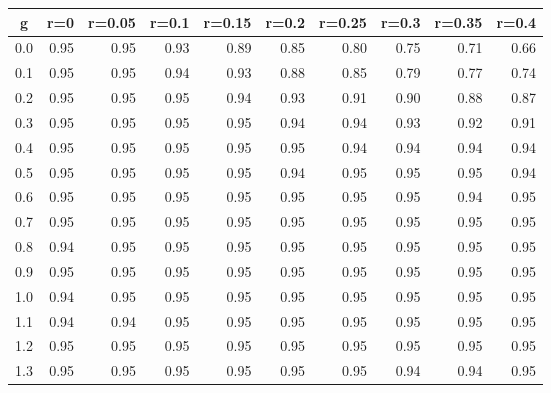%
\begin{table}[!tbp]
 \begin{center}
 \begin{tabular}{rrrrrrrrrr}\hline\hline
\multicolumn{1}{c}{g}&\multicolumn{1}{c}{r=0}&\multicolumn{1}{c}{r=0.05}&\multicolumn{1}{c}{r=0.1}&\multicolumn{1}{c}{r=0.15}&\multicolumn{1}{c}{r=0.2}&\multicolumn{1}{c}{r=0.25}&\multicolumn{1}{c}{r=0.3}&\multicolumn{1}{c}{r=0.35}&\multicolumn{1}{c}{r=0.4}\tabularnewline
\hline
0.0&0.95&0.95&0.93&0.89&0.85&0.80&0.75&0.71&0.66\tabularnewline
0.1&0.95&0.95&0.94&0.93&0.88&0.85&0.79&0.77&0.74\tabularnewline
0.2&0.95&0.95&0.95&0.94&0.93&0.91&0.90&0.88&0.87\tabularnewline
0.3&0.95&0.95&0.95&0.95&0.94&0.94&0.93&0.92&0.91\tabularnewline
0.4&0.95&0.95&0.95&0.95&0.95&0.94&0.94&0.94&0.94\tabularnewline
0.5&0.95&0.95&0.95&0.95&0.94&0.95&0.95&0.95&0.94\tabularnewline
0.6&0.95&0.95&0.95&0.95&0.95&0.95&0.95&0.94&0.95\tabularnewline
0.7&0.95&0.95&0.95&0.95&0.95&0.95&0.95&0.95&0.95\tabularnewline
0.8&0.94&0.95&0.95&0.95&0.95&0.95&0.95&0.95&0.95\tabularnewline
0.9&0.95&0.95&0.95&0.95&0.95&0.95&0.95&0.95&0.95\tabularnewline
1.0&0.94&0.95&0.95&0.95&0.95&0.95&0.95&0.95&0.95\tabularnewline
1.1&0.94&0.94&0.95&0.95&0.95&0.95&0.95&0.95&0.95\tabularnewline
1.2&0.95&0.95&0.95&0.95&0.95&0.95&0.95&0.95&0.95\tabularnewline
1.3&0.95&0.95&0.95&0.95&0.95&0.95&0.94&0.94&0.95\tabularnewline
\hline
\end{tabular}

\end{center}

\end{table}

